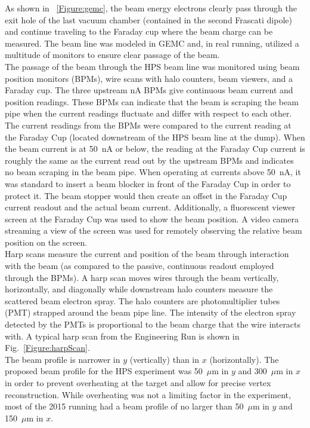 \indent As shown in ~\ref{Figure:gemc}, the beam energy electrons clearly pass through the exit hole of the last vacuum chamber (contained in the second Frascati dipole) and continue traveling to the Faraday cup where the beam charge can be measured. The beam line was modeled in GEMC and, in real running, utilized a multitude of monitors to ensure clear passage of the beam.\\
\indent The passage of the beam through the HPS beam line was monitored using beam position monitors (BPMs), wire scans with halo counters, beam viewers, and a Faraday cup. The three upstream nA BPMs give continuous beam current and position readings. These BPMs can indicate that the beam is scraping the beam pipe when the current readings fluctuate and differ with respect to each other. The current readings from the BPMs were compared to the current reading at the Faraday Cup (located downstream of the HPS beam line at the dump). When the beam current is at 50~nA or below, the reading at the Faraday Cup current is roughly the same as the current read out by the upstream BPMs and indicates no beam scraping in the beam pipe. When operating at currents above 50~nA, it was standard to insert a beam blocker in front of the Faraday Cup in order to protect it. The beam stopper would then create an offset in the Faraday Cup current readout and the actual beam current. Additionally, a fluorescent viewer screen at the Faraday Cup was used to show the beam position.  A video camera streaming a view of the screen was used for remotely observing the relative beam position on the screen. \\ 
\indent Harp scans measure the current and position of the beam through interaction with the beam (as compared to the passive, continuous readout employed through the BPMs). A harp scan moves wires through the beam vertically, horizontally, and diagonally while  downstream halo counters measure the scattered beam electron spray. The halo counters are photomultiplier tubes (PMT) strapped around the beam pipe line. The intensity of the electron spray detected by the PMTs is proportional to the beam charge that the wire interacts with. A typical harp scan from the Engineering Run is shown in Fig.~\ref{Figure:harpScan}.\\
\indent The beam profile is narrower in $y$ (vertically) than in $x$ (horizontally). The proposed beam profile for the HPS experiment was 50~$\mu$m in $y$ and 300~$\mu$m in $x$ in order to prevent overheating at the target and allow for precise vertex reconstruction. While overheating was not a limiting factor in the experiment, most of the 2015 running had a beam profile of no larger than 50~$\mu$m in $y$ and 150~$\mu$m in $x$. 

